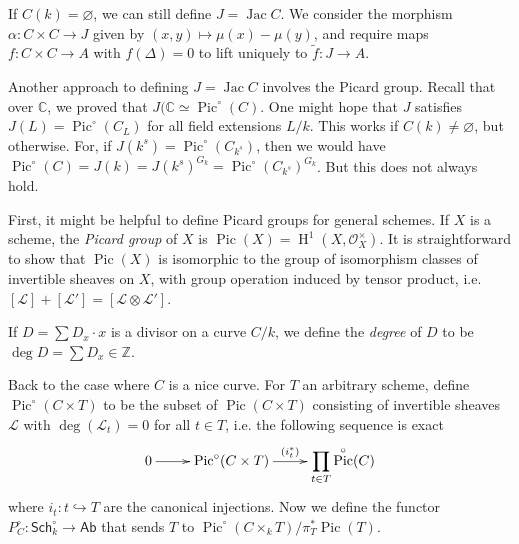 \documentclass{article}
\DeclareMathOperator{\h}{H}
\DeclareMathOperator{\jac}{Jac}
\DeclareMathOperator{\ord}{ord}
\DeclareMathOperator{\pic}{Pic}
\newcommand{\sO}{\mathscr{O}}
\theoremstyle{definition}
\begin{document}
If $C(k)=\varnothing$, we can still define $J=\jac C$. We consider the 
morphism $\alpha:C\times C\to J$ given by $(x,y)\mapsto \mu(x)-\mu(y)$, 
and require maps $f:C\times C\to A$ with $f(\Delta)=0$ to lift uniquely 
to $\tilde f:J\to A$. 

Another approach to defining $J=\jac C$ involves the Picard group. Recall 
that over $\mathbb{C}$, we proved that $J(\mathbb{C}\simeq\pic^\circ(C)$. 
One might hope that $J$ satisfies $J(L)=\pic^\circ(C_L)$ for all field 
extensions $L/k$. This works if $C(k)\ne\varnothing$, but otherwise. For, 
if $J(k^s)=\pic^\circ(C_{k^s})$, then we would have 
$\pic^\circ(C) = J(k) = J(k^s)^{G_k} = \pic^\circ(C_{k^s})^{G_k}$. But this 
does not always hold. 

First, it might be helpful to define Picard groups for general schemes. If 
$X$ is a scheme, the \emph{Picard group} of $X$ is 
$\pic(X)=\h^1(X,\sO_X^\times)$. It is straightforward to show that 
$\pic(X)$ is isomorphic to the group of isomorphism classes of invertible 
sheaves on $X$, with group operation induced by tensor product, i.e. 
$[\mathscr{L}] + [\mathscr{L'}] = [\mathscr{L}\otimes \mathscr{L}']$. 

If $D = \sum D_x\cdot x$ is a divisor on a curve $C/k$, we define the 
\emph{degree} of $D$ to be $\deg D=\sum D_x \in \mathbb{Z}$. 

Back to the case where $C$ is a nice curve. For $T$ an arbitrary scheme, define 
$\pic^\circ(C\times T)$ to be the subset of $\pic(C\times T)$ consisting of 
invertible sheaves $\mathscr{L}$ with $\deg(\mathscr{L}_t)=0$ for all $t\in T$, 
i.e. the following sequence is exact 
\[\xymatrix{
  0 \ar[r] 
    & \pic^\circ(C\times T) \ar[r]^-{(i_t^*)}
    & \displaystyle\prod_{t\in T} \pic^\circ (C) 
}\]
where $i_t:t\hookrightarrow T$ are the canonical injections. Now we define the 
functor $P_C^\circ:\mathsf{Sch}_k^\circ\to\mathsf{Ab}$ that sends $T$ to 
$\pic^\circ(C\times_k T)/\pi_T^*\pic(T)$. 
\end{document}
